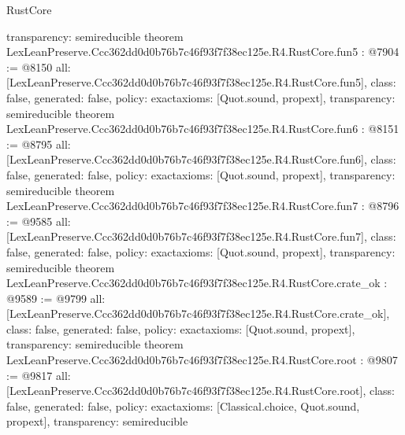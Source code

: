 \begin{lexlean}{RustCore}
\begin{coremodule}
{  transparency: semireducible
}
theorem LexLeanPreserve.Ccc362dd0d0b76b7c46f93f7f38ec125e.R4.RustCore.fun5 : @7904 := @8150 {
  all: [LexLeanPreserve.Ccc362dd0d0b76b7c46f93f7f38ec125e.R4.RustCore.fun5],
  class: false,
  generated: false,
  policy: exact{axioms: [Quot.sound, propext]},
  transparency: semireducible
}
theorem LexLeanPreserve.Ccc362dd0d0b76b7c46f93f7f38ec125e.R4.RustCore.fun6 : @8151 := @8795 {
  all: [LexLeanPreserve.Ccc362dd0d0b76b7c46f93f7f38ec125e.R4.RustCore.fun6],
  class: false,
  generated: false,
  policy: exact{axioms: [Quot.sound, propext]},
  transparency: semireducible
}
theorem LexLeanPreserve.Ccc362dd0d0b76b7c46f93f7f38ec125e.R4.RustCore.fun7 : @8796 := @9585 {
  all: [LexLeanPreserve.Ccc362dd0d0b76b7c46f93f7f38ec125e.R4.RustCore.fun7],
  class: false,
  generated: false,
  policy: exact{axioms: [Quot.sound, propext]},
  transparency: semireducible
}
theorem LexLeanPreserve.Ccc362dd0d0b76b7c46f93f7f38ec125e.R4.RustCore.crate_ok : @9589 := @9799 {
  all: [LexLeanPreserve.Ccc362dd0d0b76b7c46f93f7f38ec125e.R4.RustCore.crate_ok],
  class: false,
  generated: false,
  policy: exact{axioms: [Quot.sound, propext]},
  transparency: semireducible
}
theorem LexLeanPreserve.Ccc362dd0d0b76b7c46f93f7f38ec125e.R4.RustCore.root : @9807 := @9817 {
  all: [LexLeanPreserve.Ccc362dd0d0b76b7c46f93f7f38ec125e.R4.RustCore.root],
  class: false,
  generated: false,
  policy: exact{axioms: [Classical.choice, Quot.sound, propext]},
  transparency: semireducible
}


\end{coremodule}
\end{lexlean}
